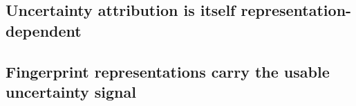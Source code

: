 \subsection{Uncertainty attribution is itself representation-dependent}

\subsection{Fingerprint representations carry the usable uncertainty signal}

